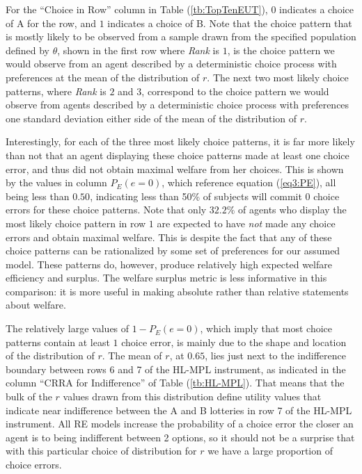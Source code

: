\documentclass[../main.tex]{subfiles}
\begin{document}
For the \enquote{Choice in Row} column in Table (\ref{tb:TopTenEUT}), $0$ indicates a choice of A for the row, and $1$ indicates a choice of B.
Note that the choice pattern that is mostly likely to be observed from a sample drawn from the specified population defined by $\theta$, shown in the first row where \textit{Rank} is $1$, is the choice pattern we would observe from an agent described by a deterministic choice process with preferences at the mean of the distribution of $r$.
The next two most likely choice patterns, where \textit{Rank} is $2$ and $3$, correspond to the choice pattern we would observe from agents described by a deterministic choice process with preferences one standard deviation either side of the mean of the distribution of $r$.

Interestingly, for each of the three most likely choice patterns, it is far more likely than not that an agent displaying these choice patterns made at least one choice error, and thus did not obtain maximal welfare from her choices.
This is shown by the values in column $P_E(e=0)$, which reference equation (\ref{eq3:PE}), all being less than $0.50$, indicating less than 50\% of subjects will commit 0 choice errors for these choice patterns.
Note that only $32.2\%$ of agents who display the most likely choice pattern in row $1$ are expected to have \textit{not} made any choice errors and obtain maximal welfare.
This is despite the fact that any of these choice patterns can be rationalized by some set of preferences for our assumed model.
These patterns do, however, produce relatively high expected welfare efficiency and surplus.
The welfare surplus metric is less informative in this comparison: it is more useful in making absolute rather than relative statements about welfare.

The relatively large values of $ 1 - P_E(e = 0)$, which imply that most choice patterns contain at least $1$ choice error, is mainly due to the shape and location of the distribution of $r$.
The mean of $r$, at $0.65$, lies just next to the indifference boundary between rows 6 and 7 of the HL-MPL instrument, as indicated in the column \enquote{CRRA for Indifference} of Table (\ref{tb:HL-MPL}).
That means that the bulk of the $r$ values drawn from this distribution define utility values that indicate near indifference between the A and B lotteries in row 7 of the HL-MPL instrument.
All RE models increase the probability of a choice error the closer an agent is to being indifferent between 2 options, so it should not be a surprise that with this particular choice of distribution for $r$ we have a large proportion of choice errors.
\end{document}
